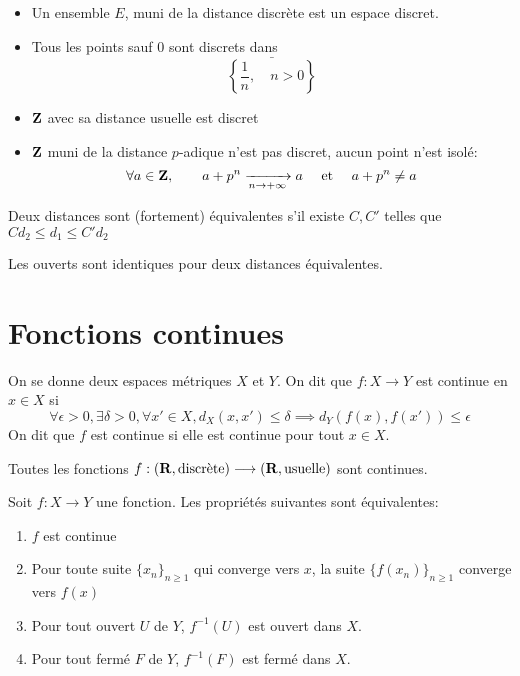 \begin{ex}
    \begin{itemize}
        \item 
 Un ensemble  $E$, muni de la distance discrète est un espace discret.
 \item Tous les points sauf $0$ sont discrets dans  \[
         \bar{ \left\{ \frac{1}{n}, \quad n>0 \right\}  }
 \] 
 \item $\mathbf Z$ avec sa distance usuelle est discret
 \item $\mathbf Z$ muni de la distance $p$-adique n'est pas discret, aucun point n'est isolé:  \[
         \forall  a \in  \mathbf Z, \qquad  a+p^n \xrightarrow[n\to +\infty]{}a \quad  \text{ et } \quad a+p^n \neq a
 \]
    \end{itemize}
\end{ex}

\begin{dfn}
    Deux distances sont (fortement) équivalentes s'il existe $C, C'$ telles que  $Cd_2 \leq d_1 \leq  C'd_2$
\end{dfn}

\begin{exo}
Les ouverts sont identiques pour deux distances équivalentes.
\end{exo}

\section{Fonctions continues}

\begin{dfn}
On se donne deux espaces métriques $X$ et  $Y$. On dit que  $f:X \longrightarrow Y$ est continue en  $x \in X$ si \[
    \forall  \epsilon>0, \exists \delta >0, \forall  x' \in  X, d_X(x, x')\leq \delta \implies d_Y(f(x), f(x'))\leq  \epsilon
\] 
On dit que  $f$ est continue si elle est continue pour tout  $x \in  X$.
\end{dfn}

\begin{exo}
    Toutes les fonctions $f:(\mathbf R, \text{discrète}) \longrightarrow (\mathbf R, \text{usuelle})$ sont continues.
\end{exo}

\begin{thm}
Soit $f:X \longrightarrow Y$ une fonction. Les propriétés suivantes sont équivalentes:  \begin{enumerate}
    \item $f$ est continue
    \item  Pour toute suite $\{x_n\}_{n\geq 1}$ qui converge vers $x$, la suite  $\{f(x_n)\}_{n\geq 1}$ converge vers $f(x)$
    \item Pour tout ouvert  $U$ de  $Y$,  $f^{-1}(U)$ est ouvert dans $X$.
    \item Pour tout fermé  $F$ de  $Y$,  $f^{-1}(F)$ est fermé dans $X$.
\end{enumerate}
\end{thm}

